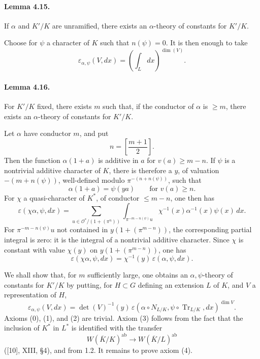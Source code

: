 \documentclass[10pt]{article}
\newcommand{\Tr}{\operatorname{Tr}}
\providecommand{\ab}{\mathrm{ab}}
\providecommand{\ab}{\mathrm{ab}}
\providecommand{\ab}{\mathrm{ab}}
\providecommand{\Tr}{\operatorname{Tr}}
\providecommand{\Tr}{\operatorname{Tr}}
\providecommand{\Tr}{\operatorname{Tr}}
\begin{document}
\paragraph{Lemma 4.15.} If \(\alpha\) and \(K'/K\) are unramified, there exists an \(\alpha\)-theory of constants for \(K'/K\).

Choose for \(\psi\) a character of \(K\) such that \(n(\psi)=0\). It is then enough to take
\[
\varepsilon_{\alpha,\psi}(V,dx)=
\left(\int_L dx\right)^{\dim(V)}.
\]

\paragraph{Lemma 4.16.} For \(K'/K\) fixed, there exists \(m\) such that, if the conductor of \(\alpha\) is \(\ge m\), there exists an \(\alpha\)-theory of constants for \(K'/K\).

Let \(\alpha\) have conductor \(m\), and put
\[
n=\left[\frac{m+1}{2}\right].
\]
Then the function \(\alpha(1+a)\) is additive in \(a\) for \(v(a)\ge m-n\). If \(\psi\) is a nontrivial additive character of \(K\), there is therefore a \(y\), of valuation \(-(m+n(\psi))\), well-defined modulo \(\pi^{-(n+n(\psi))}\), such that
\[
\alpha(1+a)=\psi(ya)\qquad\text{for }v(a)\ge n.
\]
For \(\chi\) a quasi-character of \(K^*\), of conductor \(\le m-n\), one then has
\[
\tag{4.16.1}
\varepsilon(\chi\alpha,\psi,dx)
=
\sum_{u\in\mathcal O^*/(1+(\pi^n))}
\int_{\pi^{-m-n(\psi)}u}
\chi^{-1}(x)\alpha^{-1}(x)\psi(x)\,dx.
\]
For \(\pi^{-m-n(\psi)}u\) not contained in \(y(1+(\pi^{m-n}))\), the corresponding partial integral is zero: it is the integral of a nontrivial additive character. Since \(\chi\) is constant with value \(\chi(y)\) on \(y(1+(\pi^{m-n}))\), one has
\[
\varepsilon(\chi\alpha,\psi,dx)
=
\chi^{-1}(y)\,\varepsilon(\alpha,\psi,dx).
\]

We shall show that, for \(m\) sufficiently large, one obtains an \(\alpha,\psi\)-theory of constants for \(K'/K\) by putting, for \(H\subset G\) defining an extension \(L\) of \(K\), and \(V\) a representation of \(H\),
\[
\varepsilon_{\alpha,\psi}(V,dx)
=
\det(V)^{-1}(y)\,
\varepsilon(\alpha\circ N_{L/K},\psi\circ\Tr_{L/K},dx)^{\dim V}.
\]
Axioms (0), (1), and (2) are trivial. Axiom (3) follows from the fact that the inclusion of \(K^*\) in \(L^*\) is identified with the transfer
\[
W(\overline K/K)^{\ab}\longrightarrow W(\overline K/L)^{\ab}
\]
([10], XIII, §4), and from 1.2. It remains to prove axiom (4).
\end{document}
